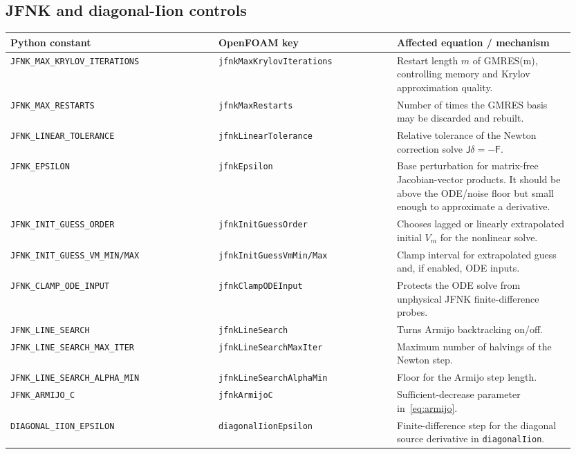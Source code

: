 \documentclass[11pt,a4paper]{article}
\newcommand{\Vm}{V_{m}}
\newcommand{\code}[1]{\texttt{\small #1}}
\begin{document}
\subsection{JFNK and diagonal-Iion controls}
\begin{longtable}{@{}p{0.35\linewidth}p{0.30\linewidth}p{0.30\linewidth}@{}}
\toprule
Python constant & OpenFOAM key & Affected equation / mechanism \\
\midrule \endhead
\code{JFNK\_MAX\_KRYLOV\_ITERATIONS} & \code{jfnkMaxKrylovIterations} &
   Restart length $m$ of GMRES(m), controlling memory and Krylov
   approximation quality. \\
\code{JFNK\_MAX\_RESTARTS} & \code{jfnkMaxRestarts} &
   Number of times the GMRES basis may be discarded and rebuilt. \\
\code{JFNK\_LINEAR\_TOLERANCE} & \code{jfnkLinearTolerance} &
   Relative tolerance of the Newton correction solve
   $\mathsf{J}\delta=-\mathsf{F}$. \\
\code{JFNK\_EPSILON} & \code{jfnkEpsilon} &
   Base perturbation for matrix-free Jacobian-vector products. It should
   be above the ODE/noise floor but small enough to approximate a
   derivative. \\
\code{JFNK\_INIT\_GUESS\_ORDER} & \code{jfnkInitGuessOrder} &
   Chooses lagged or linearly extrapolated initial $\Vm$ for the
   nonlinear solve. \\
\code{JFNK\_INIT\_GUESS\_VM\_MIN/MAX} &
   \code{jfnkInitGuessVmMin/Max} &
   Clamp interval for extrapolated guess and, if enabled, ODE inputs. \\
\code{JFNK\_CLAMP\_ODE\_INPUT} & \code{jfnkClampODEInput} &
   Protects the ODE solve from unphysical JFNK finite-difference probes. \\
\code{JFNK\_LINE\_SEARCH} & \code{jfnkLineSearch} &
   Turns Armijo backtracking on/off. \\
\code{JFNK\_LINE\_SEARCH\_MAX\_ITER} &
   \code{jfnkLineSearchMaxIter} &
   Maximum number of halvings of the Newton step. \\
\code{JFNK\_LINE\_SEARCH\_ALPHA\_MIN} &
   \code{jfnkLineSearchAlphaMin} &
   Floor for the Armijo step length. \\
\code{JFNK\_ARMIJO\_C} & \code{jfnkArmijoC} &
   Sufficient-decrease parameter in~\eqref{eq:armijo}. \\
\code{DIAGONAL\_IION\_EPSILON} & \code{diagonalIionEpsilon} &
   Finite-difference step for the diagonal source derivative in
   \code{diagonalIion}. \\
\bottomrule
\end{longtable}
\end{document}
